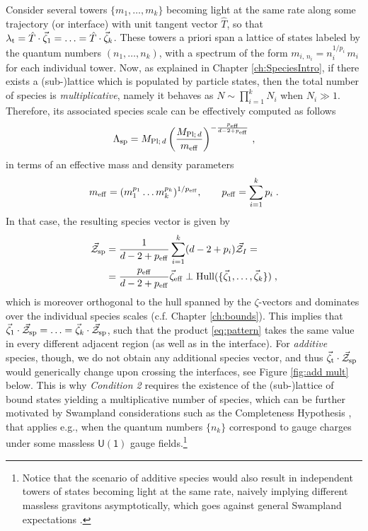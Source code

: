 Consider several towers $\{m_1,\ldots,m_k\}$ becoming light at the same rate along some trajectory (or interface) with unit tangent vector $\hat{T}$, so that $\lambda_{\rm t}=\hat{T}\cdot\vec{\zeta}_{1}=\ldots=\hat{T}\cdot\vec{\zeta}_{k}$. These towers a priori span a lattice of states labeled by the quantum numbers $(n_1,\ldots,n_k)$, with a spectrum of the form $m_{i,\, n_i} = n_i^{1/p_i}\, m_i$ for each individual tower. Now, as explained in Chapter \ref{ch:SpeciesIntro}, if there exists a (sub-)lattice which is populated by particle states, then the total number of species is \emph{multiplicative}, namely it behaves as $N\sim \prod_{i=1}^k N_i$ when $N_i \gg1$. Therefore, its associated species scale can be effectively computed as follows
%
\begin{equation}\label{eq:multspecies}
	\Lambda_{\rm sp}=M_{\text{Pl;}\, d}\left(\frac{M_{{\rm Pl;}\,d}}{m_{\rm eff}}\right)^{-\frac{p_{\rm eff}}{d-2+p_{\rm eff}}}\, ,
\end{equation}	
%
in terms of an effective mass and density parameters
%
\begin{equation}\label{e:eff tow}
	m_{\rm eff}=(m_1^{p_1} \ldots m_k^{p_k})^{1/p_{\rm eff}},\qquad p_{\rm eff}=\sum_{i=1}^kp_i\; .
\end{equation}
%
In that case, the resulting species vector is given by
%
\begin{align}\label{e: Z mult}
	\vec{\mathcal{Z}}_{\rm sp}&=\frac{1}{d-2+p_{\rm eff}}\sum_{i=1}^k(d-2+p_i)\vec{\mathcal{Z}}_I=\notag\\
	&=\frac{p_{\rm eff}}{d-2+p_{\rm eff}}\vec{\zeta}_{\rm eff}\perp{\rm Hull}(\{\vec{\zeta}_1, \ldots ,\vec{\zeta}_k\})\; ,
\end{align}
%
which is moreover orthogonal to the hull spanned by the $\zeta$-vectors and dominates over the individual species scales (c.f. Chapter \ref{ch:bounds}). This implies that $\vec{\zeta}_1\cdot \vec{\mathcal{Z}}_{\rm sp}=\ldots= \vec{\zeta}_k\cdot \vec{\mathcal{Z}}_{\rm sp}$, such that the product \eqref{eq:pattern} takes the same value in every different adjacent region (as well as in the interface). For \emph{additive} species, though, we do not obtain any additional species vector, and thus $\vec{\zeta}_{\rm t}\cdot \vec{\mathcal{Z}}_{\rm sp}$ would generically change upon crossing the interfaces, see Figure \ref{fig:add mult} below. This is why \emph{Condition 2} requires the existence of the (sub-)lattice of bound states yielding a multiplicative number of species, which can be further motivated by Swampland considerations such as the Completeness Hypothesis \cite{Banks:2010zn,Polchinski:2003bq}, that applies e.g., when the quantum numbers $\{n_k \}$ correspond to gauge charges under some massless $\mathsf{U(1)}$ gauge fields.\footnote{Notice that the scenario of additive species would also result in independent towers of states becoming light at the same rate, naively implying different massless gravitons asymptotically, which goes against general Swampland expectations \cite{Bedroya:2023tch,Kim:2019ths}.}

